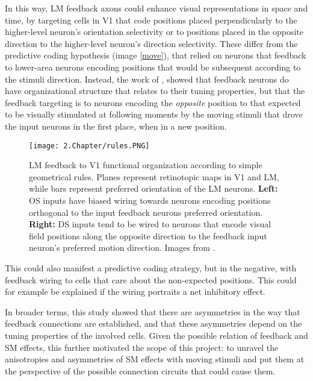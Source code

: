 In this way, LM feedback axons could enhance visual representations in space and time, by targeting cells in V1 that code positions placed perpendicularly to the higher-level neuron's orientation selectivity or to positions placed in the opposite direction to the higher-level neuron's direction selectivity. These differ from the predictive coding hypothesis (image \ref{move}), that relied on neurons that feedback to lower-area neurons encoding positions that would be subsequent according to the stimuli direction. Instead, the work of \cite{Marques2018},  showed that feedback neurons do have organizational structure that relates to their tuning properties, but that the feedback targeting is to neurons encoding the \textit{opposite} position to that expected to be visually stimulated at following moments by the moving stimuli that drove the input neurons in the first place, when in a new position. 

\begin{figure}[H]
\center
\texttt{[image: 2.Chapter/rules.PNG]}
\caption{LM feedback to V1 functional organization according to simple geometrical rules. Planes represent retinotopic maps in V1 and LM, while bars represent preferred orientation of the LM neurons. \newline \textbf{Left:} OS inputs have biased wiring towards neurons encoding positions orthogonal to the input feedback neurons preferred orientation.
\newline \textbf{Right:} DS inputs tend to be wired to neurons that encode visual field positions along the opposite direction to the feedback input neuron's preferred motion direction.
\newline \newline \tiny{Images from \cite{Marques2018}.}}
\label{rules}
\end{figure}

This could also manifest a predictive coding strategy, but in the negative, with feedback wiring to cells that care about the non-expected positions. This could for example be explained if the wiring portraits a net inhibitory effect.

In broader terms, this study showed that there are asymmetries in the way that feedback connections are established, and that these asymmetries depend on the tuning properties of the involved cells. 
Given the possible relation of feedback and SM effects, this further motivated the scope of this project: to unravel the anisotropies and asymmetries of SM effects with moving stimuli and put them at the perspective of the possible connection circuits that could cause them.
